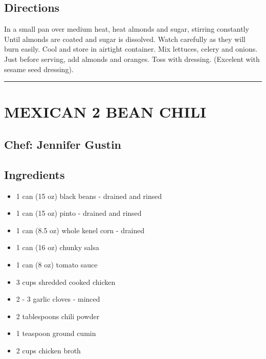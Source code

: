 \documentclass[
]{book}
\providecommand{\tightlist}{%
  \setlength{\itemsep}{0pt}\setlength{\parskip}{0pt}}
\begin{document}
\hypertarget{directions-20}{%
\subsection*{Directions}\label{directions-20}}


In a small pan over medium heat, heat almonds and sugar, stirring constantly
Until almonds are coated and sugar is dissolved. Watch carefully as they will burn easily.
Cool and store in airtight container. Mix lettuces, celery and onions. Just before
serving, add almonds and oranges. Toss with dressing. (Excelent with sesame seed dressing).

\begin{center}\rule{0.5\linewidth}{0.5pt}\end{center}

\hypertarget{mexican-2-bean-chili}{%
\section*{MEXICAN 2 BEAN CHILI}\label{mexican-2-bean-chili}}


\hypertarget{chef-jennifer-gustin-5}{%
\subsection*{Chef: Jennifer Gustin}\label{chef-jennifer-gustin-5}}


\hypertarget{ingredients-21}{%
\subsection*{Ingredients}\label{ingredients-21}}


\begin{itemize}
\tightlist
\item
  1 can (15 oz) black beans - drained and rinsed
\item
  1 can (15 oz) pinto - drained and rinsed
\item
  1 can (8.5 oz) whole kenel corn - drained
\item
  1 can (16 oz) chunky salsa
\item
  1 can (8 oz) tomato sauce
\item
  3 cups shredded cooked chicken
\item
  2 - 3 garlic cloves - minced
\item
  2 tablespoons chili powder
\item
  1 teaspoon ground cumin
\item
  2 cups chicken broth
\end{itemize}
\end{document}
